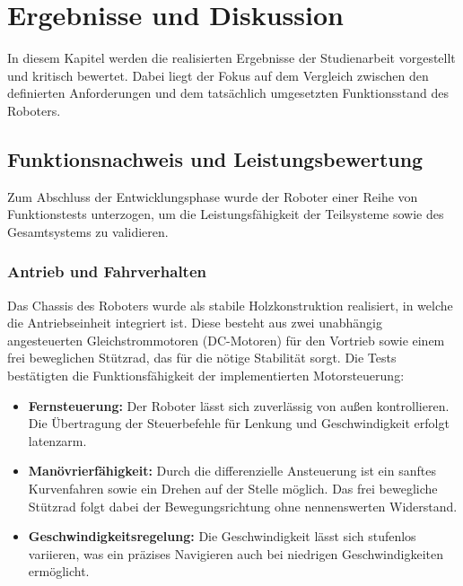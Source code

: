 \chapter{Ergebnisse und Diskussion}
\label{cha:Ergebnisse und Diskussion}

In diesem Kapitel werden die realisierten Ergebnisse der Studienarbeit vorgestellt
und kritisch bewertet. Dabei liegt der Fokus auf dem Vergleich zwischen den definierten Anforderungen und dem tatsächlich umgesetzten Funktionsstand des Roboters.

\section{Funktionsnachweis und Leistungsbewertung}
\label{cha:Funktionsnachweis und Leistungsbewertung}

Zum Abschluss der Entwicklungsphase wurde der Roboter einer Reihe von Funktionstests unterzogen, um die Leistungsfähigkeit der Teilsysteme sowie des Gesamtsystems zu validieren.

\subsection{Antrieb und Fahrverhalten}
\label{cha:Antrieb und Fahrverhalten}

Das Chassis des Roboters wurde als stabile Holzkonstruktion realisiert, in welche die Antriebseinheit integriert ist. Diese besteht aus zwei unabhängig angesteuerten Gleichstrommotoren (DC-Motoren) für den Vortrieb sowie einem frei beweglichen Stützrad, das für die nötige Stabilität sorgt. Die Tests bestätigten die Funktionsfähigkeit der implementierten Motorsteuerung:

\begin{itemize}
	\item \textbf{Fernsteuerung:} Der Roboter lässt sich zuverlässig von außen kontrollieren. Die Übertragung der Steuerbefehle für Lenkung und Geschwindigkeit erfolgt latenzarm.
	
	\item \textbf{Manövrierfähigkeit:} Durch die differenzielle Ansteuerung ist ein sanftes Kurvenfahren sowie ein Drehen auf der Stelle möglich. Das frei bewegliche Stützrad folgt dabei der Bewegungsrichtung ohne nennenswerten Widerstand.
	
	\item \textbf{Geschwindigkeitsregelung:} Die Geschwindigkeit lässt sich stufenlos variieren, was ein präzises Navigieren auch bei niedrigen Geschwindigkeiten ermöglicht.
\end{itemize}

